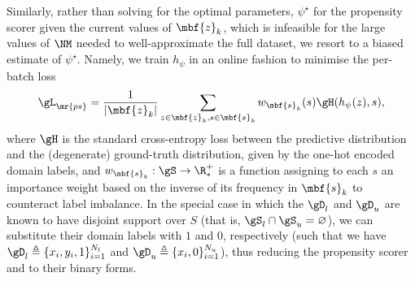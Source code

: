 Similarly, rather than solving for the optimal parameters, $\psi^\star$ for the propensity scorer
given the current values of $\mbf{z}_k$, which is infeasible for the large values of $\NM$ needed
to well-approximate the full dataset, we resort to a biased estimate of $\psi^\star$.
%
Namely, we train $h_\psi$ in an online fashion to minimise the per-batch loss 
%
\begin{equation}
\gL_\mr{ps} = \frac{1}{|\mbf{z}_k|} \sum_{ z \in \mbf{z}_k, s \in \mbf{s}_k } w_{\mbf{s}_k}(s) \gH(h_{\psi}(z), s), 
\end{equation}
%
where $\gH$ is the standard cross-entropy loss between the predictive distribution and the
(degenerate) ground-truth distribution, given by the one-hot encoded domain labels, and
$w_{\mbf{s}_k}: \gS \to \R^+_*$ is a function assigning to each $s$ an importance weight
\citep{shimodaira2000improving} based on the inverse of its frequency in $\mbf{s}_k$ to counteract
label imbalance.
%
In the special case in which the $\gD_l$ and $\gD_u$ are known to have disjoint support over $S$
(that is, $\gS_l \cap \gS_u = \varnothing$), we can substitute their domain labels with $1$ and
$0$, respectively (such that we have $\gD_l \triangleq \{ x_i, y_i, 1 \}_{i=1}^{N_l}$ and $\gD_u
\triangleq \{x_i, 0 \}_{i=1}^{N_u}$), thus reducing the propensity scorer and \CNN{} to their
binary
forms. 
%
